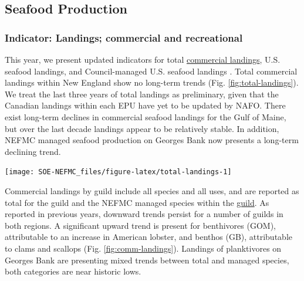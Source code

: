 \documentclass[
  10pt,
]{article}
\let\origfigure\figure
\let\endorigfigure\endfigure
\renewenvironment{figure}[1][2] {
    \expandafter\origfigure\expandafter[H]
} {
    \endorigfigure
}
\begin{document}
\hypertarget{seafood-production}{%
\subsection{Seafood Production}\label{seafood-production}}

\hypertarget{indicator-landings-commercial-and-recreational}{%
\subsubsection{Indicator: Landings; commercial and recreational}\label{indicator-landings-commercial-and-recreational}}

This year, we present updated indicators for total \href{https://noaa-edab.github.io/catalog/commercial-landings-and-revenue.html}{commercial landings}, U.S. seafood landings, and Council-managed U.S. seafood landings . Total commercial landings within New England show no long-term trends (Fig. \ref{fig:total-landings}). We treat the last three years of total landings as preliminary, given that the Canadian landings within each EPU have yet to be updated by NAFO. There exist long-term declines in commercial seafood landings for the Gulf of Maine, but over the last decade landings appear to be relatively stable. In addition, NEFMC managed seafood production on Georges Bank now presents a long-term declining trend.

\begin{figure}

{\centering \texttt{[image: SOE-NEFMC\_files/figure-latex/total-landings-1]} 

}

\caption{Total commercial landings (black), total U.S. seafood landings (blue), and New England managed U.S. seafood landings (red) for Georges Bank (GB) and the Gulf of Maine (GOM). Open circles represent years that are lacking NAFO (foreign) data.}\label{fig:total-landings}
\end{figure}

Commercial landings by guild include all species and all uses, and are reported as total for the guild and the NEFMC managed species within the \href{https://noaa-edab.github.io/catalog/feeding-guilds-by-management-bodies.html}{guild}. As reported in previous years, downward trends persist for a number of guilds in both regions. A significant upward trend is present for benthivores (GOM), attributable to an increase in American lobster, and benthos (GB), attributable to clams and scallops (Fig. \ref{fig:comm-landings}). Landings of planktivores on Georges Bank are presenting mixed trends between total and managed species, both categories are near historic lows.
\end{document}
